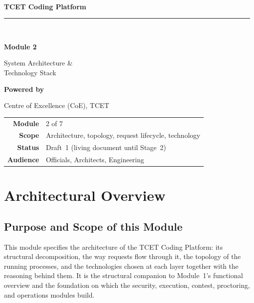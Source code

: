 \documentclass[12pt,a4paper,oneside]{report}
\begin{document}
\begin{titlepage}\centering
\vspace*{1.4cm}{\color{tcetaccent}\rule{\linewidth}{1.2pt}}\\[0.5cm]
{\LARGE\bfseries TCET Coding Platform\par}
{\color{tcetaccent}\rule{\linewidth}{1.2pt}}\\[1.4cm]
{\Huge\bfseries\color{tcetblue} Module 2\par}\vspace{0.3cm}
{\Huge System Architecture \&\\[0.2cm] Technology Stack\par}\vspace{2.2cm}
{\large\bfseries Powered by\par}{\Large\color{tcetblue} Centre of Excellence (CoE), TCET\par}\vfill
\begin{tabular}{rl}\textbf{Module} & 2 of 7\\[3pt]
\textbf{Scope} & Architecture, topology, request lifecycle, technology\\[3pt]
\textbf{Status} & Draft~1 (living document until Stage~2)\\[3pt]
\textbf{Audience} & Officials, Architects, Engineering\\\end{tabular}
\vspace{0.8cm}{\small\itshape \today\par}\end{titlepage}
\tableofcontents\clearpage{}

\chapter{Architectural Overview}
\section{Purpose and Scope of this Module}
This module specifies the architecture of the TCET Coding Platform:
its structural decomposition, the way requests flow through it, the topology of
the running processes, and the technologies chosen at each layer together with
the reasoning behind them. It is the structural companion to Module~1's
functional overview and the foundation on which the security, execution,
contest, proctoring, and operations modules build.
\end{document}
